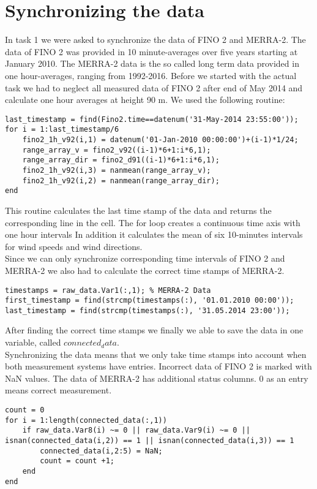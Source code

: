 \documentclass[10pt]{article}
\begin{document}
\section{Synchronizing the data}
In task 1 we were asked to synchronize the data of FINO 2 and MERRA-2. The data of FINO 2 was provided in 10 minute-averages over five years starting at January 2010. 
The MERRA-2 data is the so called long term data provided in one hour-averages, ranging from 1992-2016.
Before we started with the actual task we had to neglect all measured data of FINO 2 after end of May 2014 and calculate one hour averages at height 90 m.
We used the following routine:
\begin{lstlisting}
last_timestamp = find(Fino2.time==datenum('31-May-2014 23:55:00'));
for i = 1:last_timestamp/6
    fino2_1h_v92(i,1) = datenum('01-Jan-2010 00:00:00')+(i-1)*1/24;
    range_array_v = fino2_v92((i-1)*6+1:i*6,1);
    range_array_dir = fino2_d91((i-1)*6+1:i*6,1);
    fino2_1h_v92(i,3) = nanmean(range_array_v);
    fino2_1h_v92(i,2) = nanmean(range_array_dir);
end
\end{lstlisting}
This routine calculates the last time stamp of the data and returns the corresponding line in the cell. The for loop creates a continuous time axis with one hour intervals  In addition it calculates the mean of six 10-minutes intervals for wind speeds and wind directions.\\
Since we can only synchronize corresponding time intervals of FINO 2 and MERRA-2 we also had to calculate the correct time stamps of MERRA-2. 
\begin{lstlisting}
timestamps = raw_data.Var1(:,1); % MERRA-2 Data
first_timestamp = find(strcmp(timestamps(:), '01.01.2010 00:00'));
last_timestamp = find(strcmp(timestamps(:), '31.05.2014 23:00'));
\end{lstlisting}
After finding the correct time stamps we finally we able to save the data in one variable, called $connected_data$.\\
Synchronizing the data means that we only take time stamps into account when both measurement systems have entries. Incorrect data of FINO 2 is marked with NaN values. The data of MERRA-2 has additional status columns. $0$ as an entry means correct measurement.
\begin{lstlisting}
count = 0 
for i = 1:length(connected_data(:,1))
    if raw_data.Var8(i) ~= 0 || raw_data.Var9(i) ~= 0 || isnan(connected_data(i,2)) == 1 || isnan(connected_data(i,3)) == 1
        connected_data(i,2:5) = NaN;
        count = count +1;
    end
end
\end{lstlisting}
\end{document}
